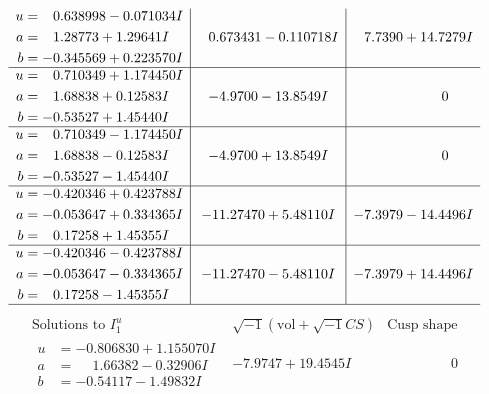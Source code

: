 \documentclass[1p]{elsarticle_modified}
\theoremstyle{definition}
\newcommand{\I}{\sqrt{-1}}
\begin{document}
$$\begin{array}{c|c|c}
\begin{aligned}
u &= \phantom{-}0.638998 - 0.071034 I \\
a &= \phantom{-}1.28773 + 1.29641 I \\
b &= -0.345569 + 0.223570 I\end{aligned}
 & \phantom{-}0.673431 - 0.110718 I & \phantom{-}7.7390 + 14.7279 I \\ \hline\begin{aligned}
u &= \phantom{-}0.710349 + 1.174450 I \\
a &= \phantom{-}1.68838 + 0.12583 I \\
b &= -0.53527 + 1.45440 I\end{aligned}
 & -4.9700 - 13.8549 I & \phantom{-0.000000 } 0 \\ \hline\begin{aligned}
u &= \phantom{-}0.710349 - 1.174450 I \\
a &= \phantom{-}1.68838 - 0.12583 I \\
b &= -0.53527 - 1.45440 I\end{aligned}
 & -4.9700 + 13.8549 I & \phantom{-0.000000 } 0 \\ \hline\begin{aligned}
u &= -0.420346 + 0.423788 I \\
a &= -0.053647 + 0.334365 I \\
b &= \phantom{-}0.17258 + 1.45355 I\end{aligned}
 & -11.27470 + 5.48110 I & -7.3979 - 14.4496 I \\ \hline\begin{aligned}
u &= -0.420346 - 0.423788 I \\
a &= -0.053647 - 0.334365 I \\
b &= \phantom{-}0.17258 - 1.45355 I\end{aligned}
 & -11.27470 - 5.48110 I & -7.3979 + 14.4496 I\\
 \hline 
 \end{array}$$\newpage$$\begin{array}{c|c|c}  
\text{Solutions to }I^u_{1}& \I (\text{vol} + \sqrt{-1}CS) & \text{Cusp shape}\\
 \hline 
\begin{aligned}
u &= -0.806830 + 1.155070 I \\
a &= \phantom{-}1.66382 - 0.32906 I \\
b &= -0.54117 - 1.49832 I\end{aligned}
 & -7.9747 + 19.4545 I & \phantom{-0.000000 } 0 \\ \hline\begin{aligned}

\end{aligned}
\end{array}$$
\end{document}
